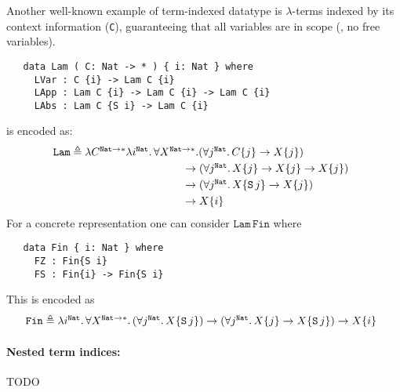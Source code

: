 \begin{example} Another well-known example of term-indexed datatype
	is \mbox{$\lambda$-terms} indexed by its context information
	(\texttt{C}), guaranteeing that all variables are in scope
	(\ie, no free variables).
\begin{verbatim}
   data Lam ( C: Nat -> * ) { i: Nat } where
     LVar : C {i} -> Lam C {i}
     LApp : Lam C {i} -> Lam C {i} -> Lam C {i}
     LAbs : Lam C {S i} -> Lam C {i}
\end{verbatim}
is encoded as:
\[
\mathtt{Lam} \triangleq
\!\!\!
\begin{array}[t]{l}
\lambda C^{\mathtt{Nat}\to*}
\lambda i^\mathtt{Nat}.\,\forall X^{\mathtt{Nat}\to*}.
  (\forall j^\mathtt{Nat}.\,C\{j\} \to X\{j\})
\\[1mm]
\qquad\qquad\qquad\qquad\quad\,
 \to(\forall j^\mathtt{Nat}.\,X\{j\} \to X\{j\} \to X\{j\})
\\[1mm]
\qquad\qquad\qquad\qquad\quad\,
\to(\forall j^\mathtt{Nat}.\,X\{\mathtt S\, j\} \to X\{j\})
\\[1mm]
\qquad\qquad\qquad\qquad\quad\,
  \to X\{i\}
\end{array}
\]
For a concrete representation one can consider
$\mathtt{Lam}\,\mathtt{Fin}$ where
\begin{verbatim}
   data Fin { i: Nat } where
     FZ : Fin{S i}
     FS : Fin{i} -> Fin{S i}
\end{verbatim}
This is encoded as
\[
\mathtt{Fin}\triangleq
\!\!\!
\begin{array}[t]{l}
\lambda i^{\mathtt{Nat}}.\,\forall X^{\mathtt{Nat}\to*}.\,
(\forall j^\mathtt{Nat}.\, X\{\mathtt S\, j\})
	\to (\forall j^\mathtt{Nat}.\, X\{j\}\to X\{\mathtt S\,j\})
	\to X\{i\}
\end{array}
\]
\end{example}

\paragraph{Nested term indices:}
TODO



